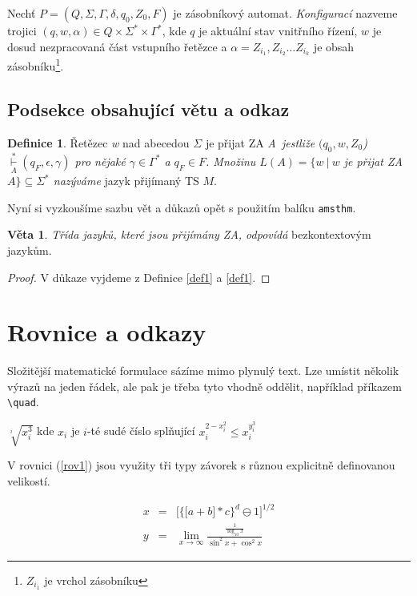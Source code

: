 \documentclass[a4paper, 11pt, twocolumn]{article}
\theoremstyle{definition}
\newtheorem{definice}{Definice}
\theoremstyle{definition}
\newtheorem{veta}{Věta}
\begin{document}
Nechť $P = (Q, \Sigma, \Gamma, \delta, q_0, Z_0, F)$ je zásobníkový automat. \emph{Konfigurací} nazveme trojici $(q, w, \alpha) \in Q \times \Sigma^* \times \Gamma^*$, kde $q$ je aktuální stav vnitřního řízení, $w$ je dosud nezpracovaná část vstupního řetězce a $\alpha = Z_{i_1}, Z_{i_2} \dots Z_{i_k}$ je obsah zásobníku\footnote{$Z_{i_1}$ je vrchol zásobníku}.

\subsection{Podsekce obsahující větu a odkaz}
\begin{definice}
\label{def2}
    Řetězec \emph{w} nad abecedou $\Sigma$ je přijat ZA \emph{A~jestliže $(q_0, w, Z_0$)  $\underset{A}{\overset{*}{\vdash}} (q_F, \epsilon, \gamma)$ pro nějaké $\gamma \in \Gamma^*$ a $q_F \in F$. Množinu $L(A) = \{w\ |\ w$ je přijat ZA $A\} \subseteq \Sigma^*$ nazýváme} jazyk přijímaný TS $M$. 
\end{definice}

Nyní si vyzkoušíme sazbu vět a důkazů opět s použitím balíku \verb|amsthm|.

\begin{veta}
\label{vet1}
    \emph{Třída jazyků, které jsou přijímány ZA, odpovídá} bezkontextovým jazykům.
\end{veta}

\begin{proof}
\label{duk1}
    V důkaze vyjdeme z Definice \ref{def1} a \ref{def1}.
\end{proof}

\section{Rovnice a odkazy}

Složitější matematické formulace sázíme mimo plynulý text. Lze umístit několik výrazů na jeden řádek, ale pak je třeba tyto vhodně oddělit, například příkazem \verb|\quad|.

\begin{center}
$\sqrt[i]{x^3_i}$ kde $x_i$ je $i$-té sudé číslo splňující $x_i^{2-x_i^2} \leq x_i^{y_i^3}$
\end{center}

V rovnici (\ref{rov1}) jsou využity tři typy závorek s různou explicitně definovanou velikostí.

\begin{eqnarray}
\label{rov1}
    x&=&\bigg[\Big\{\big[a+b\big]*c\Big\}^d\ominus1\bigg]^{1/2}\\
    y&=&\lim_{x\to\infty}\frac{\frac{1}{\log_{10}x}}{\sin^2x+\cos^2x} \nonumber
\end{eqnarray}
\end{document}
